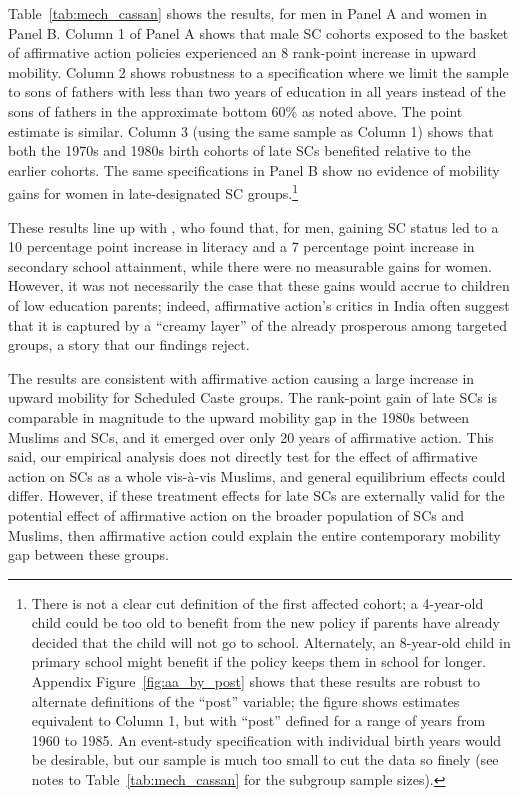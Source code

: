 \documentclass[12pt,letterpaper]{article}
\numberwithin{equation}{section}
\begin{document}
Table~\ref{tab:mech_cassan} shows the results, for men in Panel A and women in Panel B. Column 1 of Panel A shows that male SC cohorts exposed to the basket of affirmative action policies experienced an 8 rank-point increase in upward mobility. Column 2 shows robustness to a specification where we limit the sample to sons of fathers with less than two years of education in all years instead of the sons of fathers in the approximate bottom 60\% as noted above. The point estimate is similar. Column 3 (using the same sample as Column 1) shows that both the 1970s and 1980s birth cohorts of late SCs benefited relative to the earlier cohorts. The same specifications in Panel B show no evidence of mobility gains for women in late-designated SC groups.\footnote{There is not a clear cut definition of the first affected cohort; a 4-year-old child could be too old to benefit from the new policy if parents have already decided that the child will not go to school. Alternately, an 8-year-old child in primary school might benefit if the policy keeps them in school for longer. Appendix Figure~\ref{fig:aa_by_post} shows that these results are robust to alternate definitions of the ``post'' variable; the figure shows estimates equivalent to Column 1, but with ``post'' defined for a range of years from 1960 to 1985. An event-study specification with individual birth years would be desirable, but our sample is much too small to cut the data so finely (see notes to Table~\ref{tab:mech_cassan} for the subgroup sample sizes).}

These results line up with , who found that, for men, gaining SC status led to a 10 percentage point increase in literacy and a 7 percentage point increase in secondary school attainment, while there were no measurable gains for women. However, it was not necessarily the case that these gains would accrue to children of low education parents; indeed, affirmative action's critics in India often suggest that it is captured by a ``creamy layer'' of the already prosperous among targeted groups, a story that our findings reject.

The results are consistent with affirmative action causing a large increase in upward mobility for Scheduled Caste groups. The rank-point gain of late SCs is comparable in magnitude to the upward mobility gap in the 1980s between Muslims and SCs, and it emerged over only 20 years of affirmative action. This said, our empirical analysis does not directly test for the effect of affirmative action on SCs as a whole vis-\`{a}-vis Muslims, and general equilibrium effects could differ. However, if these treatment effects for late SCs are externally valid for the potential effect of affirmative action on the broader population of SCs and Muslims, then affirmative action could explain the entire contemporary mobility gap between these groups.
\end{document}
